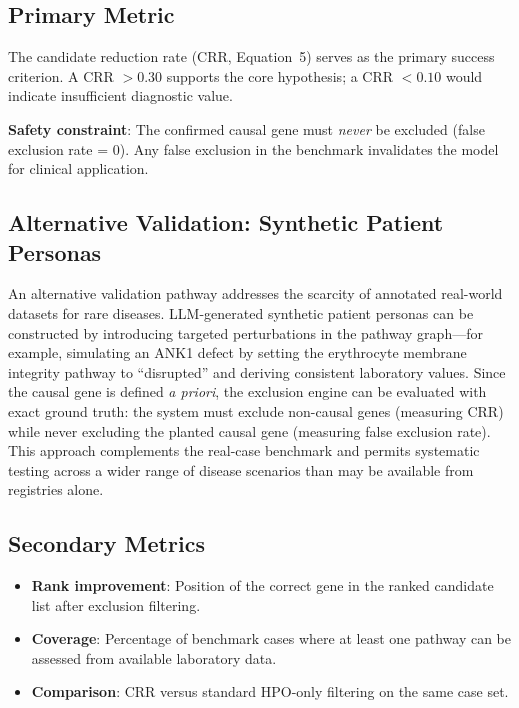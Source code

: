 \documentclass[12pt,a4paper]{article}
\begin{document}
\subsection{Primary Metric}

The candidate reduction rate (CRR, Equation~5) serves as the primary success criterion. A CRR $> 0.30$ supports the core hypothesis; a CRR $< 0.10$ would indicate insufficient diagnostic value.

\textbf{Safety constraint}: The confirmed causal gene must \emph{never} be excluded (false exclusion rate = 0). Any false exclusion in the benchmark invalidates the model for clinical application.

\subsection{Alternative Validation: Synthetic Patient Personas}

An alternative validation pathway addresses the scarcity of annotated real-world datasets for rare diseases. LLM-generated synthetic patient personas can be constructed by introducing targeted perturbations in the pathway graph---for example, simulating an ANK1 defect by setting the erythrocyte membrane integrity pathway to ``disrupted'' and deriving consistent laboratory values. Since the causal gene is defined \emph{a priori}, the exclusion engine can be evaluated with exact ground truth: the system must exclude non-causal genes (measuring CRR) while never excluding the planted causal gene (measuring false exclusion rate). This approach complements the real-case benchmark and permits systematic testing across a wider range of disease scenarios than may be available from registries alone.

\subsection{Secondary Metrics}

\begin{itemize}
    \item \textbf{Rank improvement}: Position of the correct gene in the ranked candidate list after exclusion filtering.
    \item \textbf{Coverage}: Percentage of benchmark cases where at least one pathway can be assessed from available laboratory data.
    \item \textbf{Comparison}: CRR versus standard HPO-only filtering on the same case set.
\end{itemize}
\end{document}
